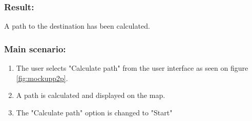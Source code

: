 \begin{framed}
	\subsubsection*{Result:}
	A path to the destination has been calculated.
	
	\subsubsection*{Main scenario:}
	\begin{enumerate}
		\item The user selects "Calculate path" from the user interface as seen on figure \ref{fig:mockupp2p}.
		\item A path is calculated and displayed on the map. 
		\item The "Calculate path" option is changed to "Start"
	\end{enumerate}	
\end{framed}	


